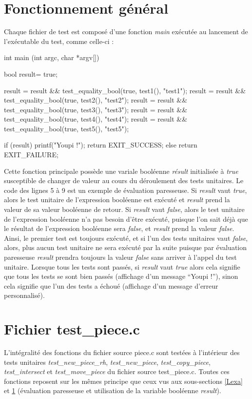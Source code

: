 \documentclass{report}
\begin{document}
\section{Fonctionnement général}
\label{Clarke}
Chaque fichier de test est composé d'une fonction \emph{main} exécutée au lancement de l'exécutable du test, comme celle-ci :
\footnotesize
\begin{verbatimtab}[10]
int main (int argc, char *argv[])
{
  bool result= true;

  result = result && test_equality_bool(true, test1(), "test1");
  result = result && test_equality_bool(true, test2(), "test2");
  result = result && test_equality_bool(true, test3(), "test3");
  result = result && test_equality_bool(true, test4(), "test4");
  result = result && test_equality_bool(true, test5(), "test5");

  if (result) {
    printf("Youpi !\n");
    return EXIT_SUCCESS;
  }
  else
    return EXIT_FAILURE;
}
\end{verbatimtab}
\normalsize

Cette fonction principale possède une variale booléenne \emph{résult} initialisée à \emph{true} susceptible de changer de valeur au cours du déroulement des tests unitaires. Le code des lignes 5 à 9 est un exemple de évaluation paresseuse. Si \emph{result} vaut \emph{true}, alors le test unitaire de l'expression booléenne est exécuté et \emph{result} prend la valeur de sa valeur booléenne de retour. Si \emph{result} vaut \emph{false}, alors le test unitaire de l'expression booléenne n'a pas besoin d'être exécuté, puisque l'on sait déjà que le résultat de l'expression booléenne sera \emph{false}, et \emph{result} prend la valeur \emph{false}. Ainsi, le premier test est toujours exécuté, et si l'un des tests unitaires vaut \emph{false}, alors, plus aucun test unitaire ne sera exécuté par la suite puisque par évaluation paresseuse \emph{result} prendra toujours la valeur \emph{false} sans arriver à l'appel du test unitaire. Lorsque tous les tests sont passés, si \emph{result} vaut \emph{true} alors cela signifie que tous les tests se sont bien passés (affichage d'un message ``Youpi !''), sinon cela signifie que l'un des tests a échoué (affichage d'un message d'erreur personnalisé).

\section{Fichier test\_piece.c}
L'intégralité des fonctions du fichier source piece.c sont testées à l'intérieur des tests unitaires \emph{test\_new\_piece\_rh}, \emph{test\_new\_piece}, \emph{test\_copy\_piece}, \emph{test\_intersect} et \emph{test\_move\_piece} du fichier source test\_piece.c. Toutes ces fonctions reposent sur les mêmes principe que ceux vus aux sous-sections \ref{Lexa} et \ref{Clarke} (évaluation paresseuse et utilisation de la variable booléenne \emph{result}).
\end{document}
